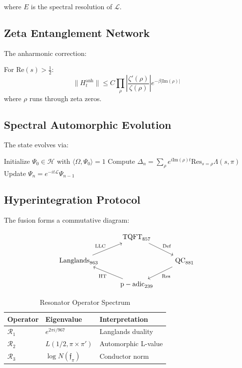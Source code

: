 \documentclass[12pt]{article}
\begin{document}
where $E$ is the spectral resolution of $\mathcal{L}$.

\subsection{Zeta Entanglement Network}
The anharmonic correction:

\begin{theorem}
For $\mathrm{Re}(s) > \frac{1}{2}$:
\begin{equation}
\|H^{\mathrm{anh}}_t\| \leq C \prod_{\rho} \left|\frac{\zeta'(\rho)}{\zeta(\rho)}\right| e^{-\beta|\mathrm{Im}(\rho)|}
\end{equation}
where $\rho$ runs through zeta zeros.
\end{theorem}

\subsection{Spectral Automorphic Evolution}
The state evolves via:

\begin{algorithm}[H]
\caption{Automorphic Entanglement}
\begin{algorithmic}[1]
\STATE Initialize $\Psi_0 \in \mathcal{H}$ with $\langle \Omega, \Psi_0 \rangle = 1$
\STATE Compute $\Delta_n = \sum_{\rho} e^{i\mathrm{Im}(\rho)t}\mathrm{Res}_{s=\rho}\Lambda(s,\pi)$
\STATE Update $\Psi_n = e^{-it\mathcal{L}} \Psi_{n-1}$
\ENDFOR
\end{algorithmic}
\end{algorithm}

\subsection{Hyperintegration Protocol}
The fusion forms a commutative diagram:

\begin{equation}
\begin{tikzcd}
& \mathrm{TQFT}_{857} \arrow[dr,"\mathrm{Def}"] & \\
\mathrm{Langlands}_{863} \arrow[ur,"\mathrm{LLC}"] & & \mathrm{QC}_{881} \arrow[dl,"\mathrm{Res}"] \\
& \mathrm{p-adic}_{239} \arrow[ul,"\mathrm{HT}"] & 
\end{tikzcd}
\end{equation}

\begin{table}[H]
\centering
\caption{Resonator Operator Spectrum}
\begin{tabular}{lll}
\textbf{Operator} & \textbf{Eigenvalue} & \textbf{Interpretation} \\
\hline
$\mathcal{R}_1$ & $e^{2\pi i/967}$ & Langlands duality \\
$\mathcal{R}_2$ & $L(1/2, \pi \times \pi')$ & Automorphic L-value \\
$\mathcal{R}_3$ & $\log N(\mathfrak{f}_\pi)$ & Conductor norm \\
\end{tabular}
\end{table}
\end{document}
